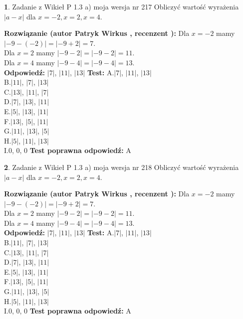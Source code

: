 \documentclass[12pt, a4paper]{article}
\theoremstyle{definition} %
\newtheorem{zad}{}
\newcommand{\zadStart}[1]{\begin{zad}#1\newline}
\newcommand{\zadStop}{\end{zad}}
\newcommand{\rozwStart}[2]{\noindent \textbf{Rozwiązanie (autor #1 , recenzent #2): }\newline}
\newcommand{\rozwStop}{\newline}
\newcommand{\odpStart}{\noindent \textbf{Odpowiedź:}\newline}
\newcommand{\odpStop}{\newline}
\newcommand{\testStart}{\noindent \textbf{Test:}\newline}
\newcommand{\testStop}{\newline}
\newcommand{\kluczStart}{\noindent \textbf{Test poprawna odpowiedź:}\newline}
\newcommand{\kluczStop}{\newline}
\begin{document}
\zadStart{Zadanie z Wikieł P 1.3 a) moja wersja nr 217}
Obliczyć wartość wyrażenia $|a - x|$ dla $x=-2,x=2,x=4$.
\zadStop
\rozwStart{Patryk Wirkus}{}
Dla $x = -2$ mamy $|-9 - (-2)| = |-9 + 2| = 7$.\\
Dla $x = 2$ mamy $|-9 - 2| = |-9 - 2| = 11$.\\
Dla $x = 4$ mamy $|-9 - 4| = |-9 - 4| = 13$.\\
\rozwStop
\odpStart
$|7|$, $|11|$, $|13|$
\odpStop
\testStart
A.$|7|$, $|11|$, $|13|$\\
B.$|11|$, $|7|$, $|13|$\\
C.$|13|$, $|11|$, $|7|$\\
D.$|7|$, $|13|$, $|11|$\\
E.$|5|$, $|13|$, $|11|$\\
F.$|13|$, $|5|$, $|11|$\\
G.$|11|$, $|13|$, $|5|$\\
H.$|5|$, $|11|$, $|13|$\\
I.$0$, $0$, $0$
\testStop
\kluczStart
A
\kluczStop



\zadStart{Zadanie z Wikieł P 1.3 a) moja wersja nr 218}
Obliczyć wartość wyrażenia $|a - x|$ dla $x=-2,x=2,x=4$.
\zadStop
\rozwStart{Patryk Wirkus}{}
Dla $x = -2$ mamy $|-9 - (-2)| = |-9 + 2| = 7$.\\
Dla $x = 2$ mamy $|-9 - 2| = |-9 - 2| = 11$.\\
Dla $x = 4$ mamy $|-9 - 4| = |-9 - 4| = 13$.\\
\rozwStop
\odpStart
$|7|$, $|11|$, $|13|$
\odpStop
\testStart
A.$|7|$, $|11|$, $|13|$\\
B.$|11|$, $|7|$, $|13|$\\
C.$|13|$, $|11|$, $|7|$\\
D.$|7|$, $|13|$, $|11|$\\
E.$|5|$, $|13|$, $|11|$\\
F.$|13|$, $|5|$, $|11|$\\
G.$|11|$, $|13|$, $|5|$\\
H.$|5|$, $|11|$, $|13|$\\
I.$0$, $0$, $0$
\testStop
\kluczStart
A
\kluczStop
\end{document}
